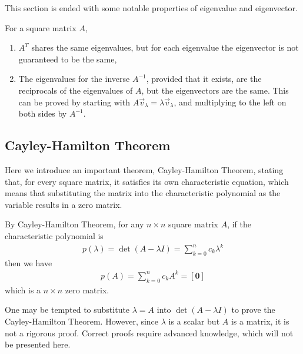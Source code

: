 This section is ended with some notable properties of eigenvalue and eigenvector.
\begin{proper}
For a square matrix $A$,
\begin{enumerate}
\item $A^T$ shares the same eigenvalues, but for each eigenvalue the eigenvector is not guaranteed to be the same,
\item The eigenvalues for the inverse $A^{-1}$, provided that it exists, are the reciprocals of the eigenvalues of $A$, but the eigenvectors are the same. This can be proved by starting with $A\vec{v}_\lambda = \lambda\vec{v}_\lambda$, and multiplying to the left on both sides by $A^{-1}$.
\end{enumerate}
\end{proper}

\subsection*{Cayley-Hamilton Theorem}
Here we introduce an important theorem, Cayley-Hamilton Theorem, stating that, for every square matrix, it satisfies its own characteristic equation, which means that substituting the matrix into the characteristic polynomial as the variable results in a zero matrix.
\begin{thm}
By Cayley-Hamilton Theorem, for any $n \times n$ square matrix $A$, if the characteristic polynomial is
\begin{align*}
p(\lambda) = \det(A-\lambda I) = \sum_{k=0}^{n} c_k \lambda^k
\end{align*}
then we have
\begin{align*}
p(A) = \sum_{k=0}^{n} c_k A^k = [\textbf{0}]
\end{align*}
which is a $n \times n$ zero matrix.
\end{thm}
One may be tempted to substitute $\lambda = A$ into $\det(A-\lambda I)$ to prove the Cayley-Hamilton Theorem. However, since $\lambda$ is a scalar but $A$ is a matrix, it is not a rigorous proof. Correct proofs require advanced knowledge, which will not be presented here.

